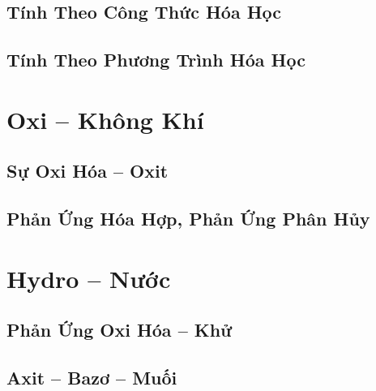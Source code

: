 \documentclass{article}
\numberwithin{equation}{section}
\begin{document}
\subsection{Tính Theo Công Thức Hóa Học}


\subsection{Tính Theo Phương Trình Hóa Học}


\section{Oxi -- Không Khí}

\subsection{Sự Oxi Hóa -- Oxit}


\subsection{Phản Ứng Hóa Hợp, Phản Ứng Phân Hủy}


\section{Hydro -- Nước}

\subsection{Phản Ứng Oxi Hóa -- Khử}


\subsection{Axit -- Bazơ -- Muối}

\end{document}
